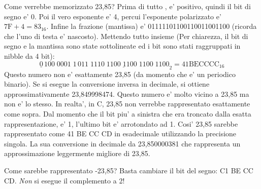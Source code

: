 Come verrebbe memorizzato 23,85? 
Prima di tutto , e' positivo, quindi il bit di segno e' 0. Poi il vero 
esponente e' 4, percui l'esponente polarizzato e' $7\mathrm{F} + 4 = 83_{16}$.
Infine la frazione (mantissa) e' 01111101100110011001100 (ricorda che
l'uno di testa e' nascosto). Mettendo tutto insieme (Per chiarezza, il
bit di segno e la mantissa sono state sottolineate ed i bit sono stati
raggruppati in nibble da 4 bit): 
\[ \underline{0}\,100\;0001\;1
   \,\underline{011\;1110\;1100\;1100\;1100\;1100}_2 = 41 \mathrm{BE} 
\mathrm{CC} \mathrm{CC}_{16} \]
Questo numero non e' esattamente 23,85 (da momento che e' un periodico
binario). Se si esegue la conversione inversa in decimale, si ottiene
approssimativamente 23,849998474. Questo numero e' molto vicino a
23,85 ma non e' lo stesso. In realta', in C, 23,85 non verrebbe
rappresentato esattamente come sopra. Dal momento che il bit piu' a 
sinistra che era troncato dalla esatta rappresentazione, e' 1, l'ultimo
bit e' arrotondato ad 1. Cosi' 23,85 sarebbe rappresentato come
41 BE CC CD in esadecimale utilizzando la precisione singola. La sua
conversione in decimale da 23,850000381 che rappresenta un approssimazione
leggermente migliore di 23,85. 

Come sarebbe rappresentato -23,85? Basta cambiare il bit del segno: C1
BE CC CD. \emph{Non} si esegue il complemento a 2!

\begin{table}[t]
\caption{Valori speciali di \emph{f} e \emph{e}\label{tab:floatSpecials}}
\end{table}

